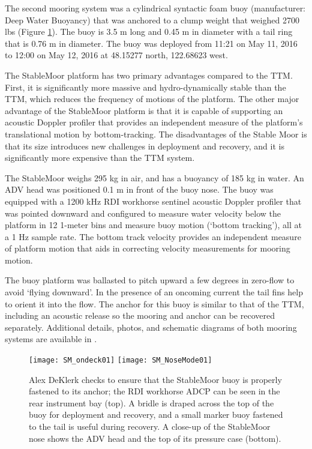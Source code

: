 The second mooring system was a cylindrical syntactic foam buoy (manufacturer: Deep Water Buoyancy) that was anchored to a clump weight that weighed 2700 lbs (Figure \ref{fig:SM}). The buoy is 3.5 m long and 0.45 m in diameter with a tail ring that is 0.76 m in diameter. The buoy was deployed from 11:21 on May 11, 2016 to 12:00 on May 12, 2016 at 48.15277 north, 122.68623 west.

The StableMoor platform has two primary advantages compared to the TTM. First, it is significantly more massive and hydro-dynamically stable than the TTM, which reduces the frequency of motions of the platform. The other major advantage of the StableMoor platform is that it is capable of supporting an acoustic Doppler profiler that provides an independent measure of the platform's translational motion by bottom-tracking. The disadvantages of the Stable Moor is that its size introduces new challenges in deployment and recovery, and it is significantly more expensive than the TTM system.

The StableMoor weighs 295 kg in air, and has a buoyancy of 185 kg in water. An ADV head was positioned 0.1 m in front of the buoy nose.  The buoy was equipped with a 1200 kHz RDI workhorse sentinel acoustic Doppler profiler that was pointed downward and configured to measure water velocity below the platform in 12 1-meter bins and measure buoy motion (`bottom tracking'), all at a 1 Hz sample rate. The bottom track velocity provides an independent measure of platform motion that aids in correcting velocity measurements for mooring motion.

The buoy platform was ballasted to pitch upward a few degrees in zero-flow to avoid `flying downward'. In the presence of an oncoming current the tail fins help to orient it into the flow. The anchor for this buoy is similar to that of the TTM, including an acoustic release so the mooring and anchor can be recovered separately. Additional details, photos, and schematic diagrams of both mooring systems are available in \cite{Harding_MotionPaper}.

\begin{figure}[t]
  \centering
  \texttt{[image: SM\_ondeck01]}
  \texttt{[image: SM\_NoseMode01]}
  \caption{Alex DeKlerk checks to ensure that the StableMoor buoy is properly fastened to its anchor; the RDI workhorse ADCP can be seen in the rear instrument bay (top). A bridle is draped across the top of the buoy for deployment and recovery, and a small marker buoy fastened to the tail is useful during recovery.  A close-up of the StableMoor nose shows the ADV head and the top of its pressure case (bottom). }
  \label{fig:SM}
\end{figure}



